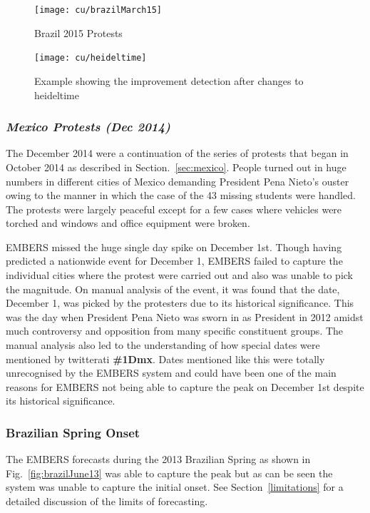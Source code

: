 \begin{figure}
\centering
\texttt{[image: cu/brazilMarch15]}
\caption{Brazil 2015 Protests}
\label{fig:brazilSpring}
\end{figure}

\begin{figure}
  \centering
\texttt{[image: cu/heideltime]}
\caption{Example showing the improvement detection after changes to
heideltime }
\label{fig:heideltime}
\end{figure}

\subsubsection{\it Mexico Protests (Dec 2014)}
The December 2014 were a continuation of the series of protests that began in October 2014
as described in Section.~\ref{sec:mexico}. People turned out in huge numbers in different cities of Mexico demanding
President Pena Nieto's ouster owing to the manner in which the case of the 43 missing students were handled.
The protests were largely peaceful except for a few cases where vehicles were torched and windows and office equipment
were broken.

EMBERS missed the huge single day spike on December 1st. Though having predicted a nationwide event for
December 1, EMBERS failed to capture the individual cities where the protest were carried out and also was unable
to pick the magnitude. On manual analysis of the event, it was found that the date, December 1,  was picked by the protesters due to
its historical significance. This was the day when President Pena Nieto was sworn
in as President in 2012 amidst much controversy and opposition from
many specific constituent groups. The manual analysis also led to the understanding of how
special dates were mentioned by twitterati {\bf \#1Dmx}. Dates mentioned like this were totally unrecognised by the EMBERS
system and could have been one of the main reasons for EMBERS not being able to capture the peak on December 1st despite its
historical significance.

\subsubsection{Brazilian Spring Onset}
The EMBERS forecasts during the 2013 Brazilian Spring as shown in Fig.~\ref{fig:brazilJune13} was able to capture
the peak but as can be seen the system was unable to capture the initial
onset.  See Section~\ref{limitations} for a detailed discussion of
the limits of forecasting.

